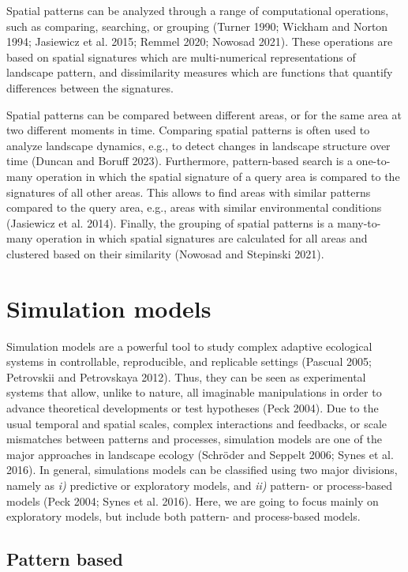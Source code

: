 \documentclass[
  12pt,
  a4paperpaper,
]{article}
\begin{document}
Spatial patterns can be analyzed through a range of computational
operations, such as comparing, searching, or grouping (Turner 1990;
Wickham and Norton 1994; Jasiewicz et al. 2015; Remmel 2020; Nowosad
2021). These operations are based on spatial signatures which are
multi-numerical representations of landscape pattern, and dissimilarity
measures which are functions that quantify differences between the
signatures.

Spatial patterns can be compared between different areas, or for the
same area at two different moments in time. Comparing spatial patterns
is often used to analyze landscape dynamics, e.g., to detect changes in
landscape structure over time (Duncan and Boruff 2023). Furthermore,
pattern-based search is a one-to-many operation in which the spatial
signature of a query area is compared to the signatures of all other
areas. This allows to find areas with similar patterns compared to the
query area, e.g., areas with similar environmental conditions (Jasiewicz
et al. 2014). Finally, the grouping of spatial patterns is a
many-to-many operation in which spatial signatures are calculated for
all areas and clustered based on their similarity (Nowosad and Stepinski
2021).

\section{Simulation models}\label{simulation-models}

Simulation models are a powerful tool to study complex adaptive
ecological systems in controllable, reproducible, and replicable
settings (Pascual 2005; Petrovskii and Petrovskaya 2012). Thus, they can
be seen as experimental systems that allow, unlike to nature, all
imaginable manipulations in order to advance theoretical developments or
test hypotheses (Peck 2004). Due to the usual temporal and spatial
scales, complex interactions and feedbacks, or scale mismatches between
patterns and processes, simulation models are one of the major
approaches in landscape ecology (Schröder and Seppelt 2006; Synes et al.
2016). In general, simulations models can be classified using two major
divisions, namely as \emph{i)} predictive or exploratory models, and
\emph{ii)} pattern- or process-based models (Peck 2004; Synes et al.
2016). Here, we are going to focus mainly on exploratory models, but
include both pattern- and process-based models.

\subsection{Pattern based}\label{pattern-based}
\end{document}
